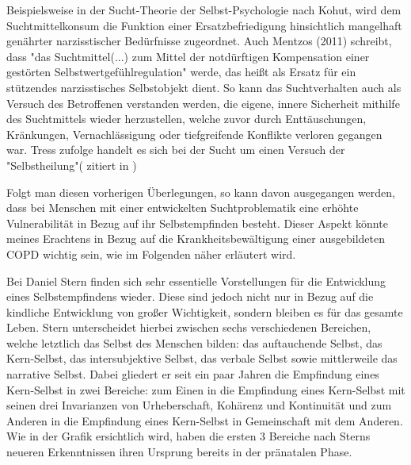 Beispielsweise in der Sucht-Theorie der Selbst-Psychologie nach Kohut, wird dem Suchtmittelkonsum die Funktion einer Ersatzbefriedigung hinsichtlich mangelhaft genährter narzisstischer Bedürfnisse zugeordnet. Auch Mentzos (2011) schreibt, dass "das Suchtmittel(...) zum Mittel der notdürftigen Kompensation einer gestörten Selbstwertgefühlregulation" werde, das heißt als Ersatz für ein stützendes narzisstisches Selbstobjekt dient. So kann das Suchtverhalten auch als Versuch des Betroffenen verstanden werden, die eigene, innere Sicherheit mithilfe des Suchtmittels wieder herzustellen, welche zuvor durch Enttäuschungen, Kränkungen, Vernachlässigung oder tiefgreifende Konflikte verloren gegangen war. Tress zufolge handelt es sich bei der Sucht um einen Versuch der "Selbstheilung"(\cite{tress1985} zitiert in \cite[222]{ermann1999})

Folgt man diesen vorherigen Überlegungen, so kann davon ausgegangen werden, dass bei Menschen mit einer entwickelten Suchtproblematik eine erhöhte Vulnerabilität in Bezug auf ihr Selbstempfinden besteht. Dieser Aspekt könnte meines Erachtens in Bezug auf die Krankheitsbewältigung einer ausgebildeten COPD wichtig sein, wie im Folgenden näher erläutert wird.

Bei Daniel Stern finden sich sehr essentielle Vorstellungen für die Entwicklung eines Selbstempfindens wieder. Diese sind jedoch nicht nur in Bezug auf die kindliche Entwicklung von großer Wichtigkeit, sondern bleiben es für das gesamte Leben. Stern unterscheidet hierbei zwischen sechs verschiedenen Bereichen, welche letztlich das Selbst des Menschen bilden: das auftauchende Selbst, das Kern-Selbst, das intersubjektive Selbst, das verbale Selbst sowie mittlerweile das narrative Selbst. Dabei gliedert er seit ein paar Jahren die Empfindung eines Kern-Selbst in zwei Bereiche: zum Einen in die Empfindung eines Kern-Selbst mit seinen drei Invarianzen von Urheberschaft, Kohärenz und Kontinuität und zum Anderen in die Empfindung eines Kern-Selbst in Gemeinschaft mit dem Anderen.  Wie in der Grafik ersichtlich wird, haben die ersten 3 Bereiche nach Sterns neueren Erkenntnissen ihren Ursprung bereits in der pränatalen Phase.


